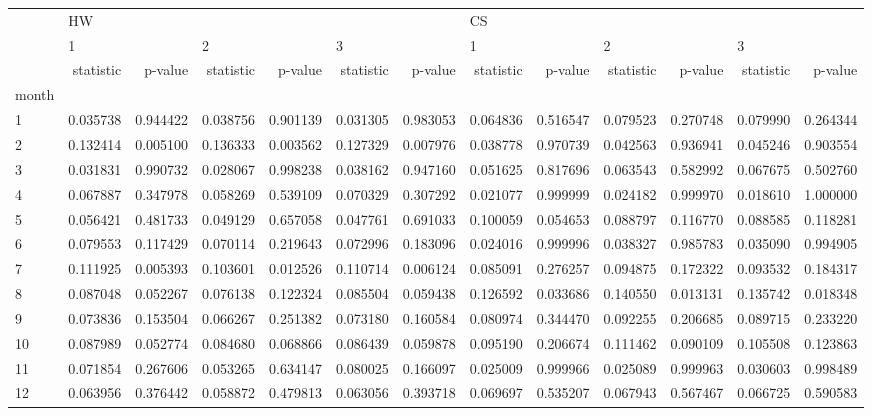 \begin{tabular}{lrrrrrrrrrrrr}
\toprule
{} & \multicolumn{6}{l}{HW} & \multicolumn{6}{l}{CS} \\
{} & \multicolumn{2}{l}{1} & \multicolumn{2}{l}{2} & \multicolumn{2}{l}{3} & \multicolumn{2}{l}{1} & \multicolumn{2}{l}{2} & \multicolumn{2}{l}{3} \\
{} & statistic &   p-value & statistic &   p-value & statistic &   p-value & statistic &   p-value & statistic &   p-value & statistic &   p-value \\
month &           &           &           &           &           &           &           &           &           &           &           &           \\
\midrule
1     &  0.035738 &  0.944422 &  0.038756 &  0.901139 &  0.031305 &  0.983053 &  0.064836 &  0.516547 &  0.079523 &  0.270748 &  0.079990 &  0.264344 \\
2     &  0.132414 &  0.005100 &  0.136333 &  0.003562 &  0.127329 &  0.007976 &  0.038778 &  0.970739 &  0.042563 &  0.936941 &  0.045246 &  0.903554 \\
3     &  0.031831 &  0.990732 &  0.028067 &  0.998238 &  0.038162 &  0.947160 &  0.051625 &  0.817696 &  0.063543 &  0.582992 &  0.067675 &  0.502760 \\
4     &  0.067887 &  0.347978 &  0.058269 &  0.539109 &  0.070329 &  0.307292 &  0.021077 &  0.999999 &  0.024182 &  0.999970 &  0.018610 &  1.000000 \\
5     &  0.056421 &  0.481733 &  0.049129 &  0.657058 &  0.047761 &  0.691033 &  0.100059 &  0.054653 &  0.088797 &  0.116770 &  0.088585 &  0.118281 \\
6     &  0.079553 &  0.117429 &  0.070114 &  0.219643 &  0.072996 &  0.183096 &  0.024016 &  0.999996 &  0.038327 &  0.985783 &  0.035090 &  0.994905 \\
7     &  0.111925 &  0.005393 &  0.103601 &  0.012526 &  0.110714 &  0.006124 &  0.085091 &  0.276257 &  0.094875 &  0.172322 &  0.093532 &  0.184317 \\
8     &  0.087048 &  0.052267 &  0.076138 &  0.122324 &  0.085504 &  0.059438 &  0.126592 &  0.033686 &  0.140550 &  0.013131 &  0.135742 &  0.018348 \\
9     &  0.073836 &  0.153504 &  0.066267 &  0.251382 &  0.073180 &  0.160584 &  0.080974 &  0.344470 &  0.092255 &  0.206685 &  0.089715 &  0.233220 \\
10    &  0.087989 &  0.052774 &  0.084680 &  0.068866 &  0.086439 &  0.059878 &  0.095190 &  0.206674 &  0.111462 &  0.090109 &  0.105508 &  0.123863 \\
11    &  0.071854 &  0.267606 &  0.053265 &  0.634147 &  0.080025 &  0.166097 &  0.025009 &  0.999966 &  0.025089 &  0.999963 &  0.030603 &  0.998489 \\
12    &  0.063956 &  0.376442 &  0.058872 &  0.479813 &  0.063056 &  0.393718 &  0.069697 &  0.535207 &  0.067943 &  0.567467 &  0.066725 &  0.590583 \\
\bottomrule
\end{tabular}
